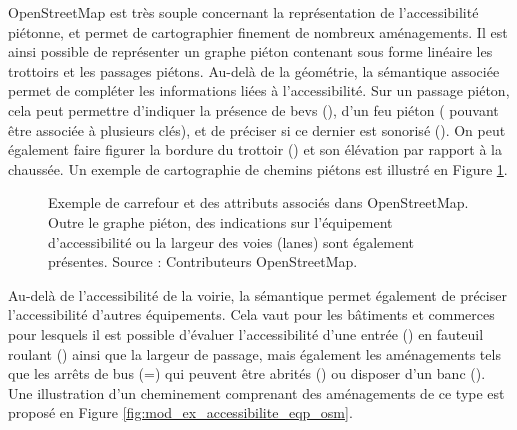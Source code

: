 
OpenStreetMap est très souple concernant la représentation de l'accessibilité piétonne, et permet de cartographier finement de nombreux aménagements. Il est ainsi possible de représenter un graphe piéton contenant sous forme linéaire les trottoirs et les passages piétons. Au-delà de la géométrie, la sémantique associée permet de compléter les informations liées à l'accessibilité. Sur un passage piéton, cela peut permettre d'indiquer la présence de \glspl{bev} (), d'un feu piéton ( pouvant être associée à plusieurs clés), et de préciser si ce dernier est sonorisé (). On peut également faire figurer la bordure du trottoir () et son élévation par rapport à la chaussée. Un exemple de cartographie de chemins piétons est illustré en Figure \ref{fig:modelisation_anatomie_carrefour_osm}.

\begin{figure}
    \centering
    \caption[Anatomie d'un carrefour dans OSM.]{Exemple de carrefour et des attributs associés dans OpenStreetMap. Outre le graphe piéton, des indications sur l'équipement d'accessibilité ou la largeur des voies (lanes) sont également présentes. Source : Contributeurs OpenStreetMap.}
    \label{fig:modelisation_anatomie_carrefour_osm}
\end{figure}

Au-delà de l'accessibilité de la voirie, la sémantique permet également de préciser l'accessibilité d'autres équipements. Cela vaut pour les bâtiments et commerces pour lesquels il est possible d'évaluer l'accessibilité d'une entrée () en fauteuil roulant () ainsi que la largeur de passage, mais également les aménagements tels que les arrêts de bus (=) qui peuvent être abrités () ou disposer d'un banc (). Une illustration d'un cheminement comprenant des aménagements de ce type est proposé en Figure \ref{fig:mod_ex_accessibilite_eqp_osm}.

